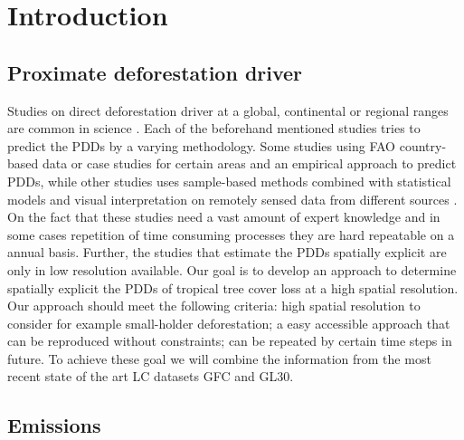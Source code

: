 \chapter{Introduction}
\label{ch:introduction}

	\section{Proximate deforestation driver}
	\label{sec:tropical_forest}
		Studies on direct deforestation driver at a global, continental or regional ranges are common in science \citep{Curtis2018,Hosonuma2012,Sy2015,Austin2019,Boucher2011,DeFries2010,Zalles2018,Carter2018,Ickowitz2015,Meyfroidt2013}. Each of the beforehand mentioned studies tries to predict the \acp{PDD} by a varying methodology. Some studies using \ac{FAO} country-based data or case studies for certain areas and an empirical approach to predict \acp{PDD}, while other studies uses sample-based methods combined with statistical models and visual interpretation on remotely sensed data from different sources \citep{Hosonuma2012,Sy2015,Austin2019,Curtis2018}. On the fact that these studies need a vast amount of expert knowledge and in some cases repetition of time consuming processes they are hard repeatable on a annual basis. Further, the studies that estimate the \acp{PDD} spatially explicit are only in low resolution available. Our goal is to develop an approach to determine spatially explicit the \acp{PDD} of tropical tree cover loss at a high spatial resolution. Our approach should meet the following criteria: high spatial resolution to consider for example small-holder deforestation; a easy accessible approach that can be reproduced without constraints; can be repeated by certain time steps in future. To achieve these goal we will combine the information from the most recent state of the art \ac{LC} datasets \ac{GFC} and \ac{GL30}.

	\section{Emissions}
	\label{sec:deforestation}

